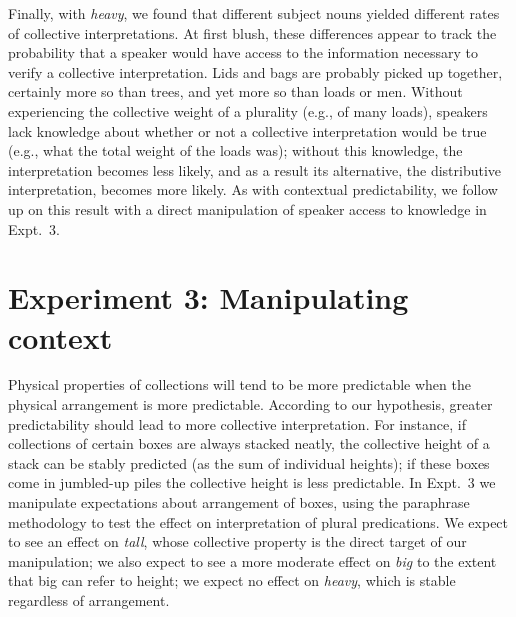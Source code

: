 \documentclass[linguex]{sp}
\begin{document}
Finally, with \emph{heavy}, we found that different subject nouns yielded different rates of collective interpretations. At first blush, these differences appear to track the probability that a speaker would have access to the information necessary to verify a collective interpretation. Lids and bags are probably picked up together, certainly more so than trees, and yet more so than loads or men. Without experiencing the collective weight of a plurality (e.g., of many loads), speakers lack knowledge about whether or not a collective interpretation would be true (e.g., what the total weight of the loads was); without this knowledge, the interpretation becomes less likely, and as a result its alternative, the distributive interpretation, becomes more likely. As with contextual predictability, we follow up on this result with a direct manipulation of speaker access to knowledge in Expt.~3.


\section{Experiment 3: Manipulating context}


Physical properties of collections will tend to be more predictable when the physical arrangement is more predictable. 
According to our hypothesis, greater predictability should lead to more collective interpretation.
For instance, if collections of certain boxes are always stacked neatly, the collective height of a stack can be stably predicted (as the sum of individual heights); if these boxes come in jumbled-up piles the collective height is less predictable.
In Expt.~3 we manipulate expectations about arrangement of boxes, using the paraphrase methodology to test the effect on interpretation of plural predications. We expect to see an effect on \emph{tall}, whose collective property is the direct target of our manipulation; we also expect to see a more moderate effect on \emph{big} to the extent that big can refer to height; we expect no effect on \emph{heavy}, which is stable regardless of arrangement.
\end{document}
